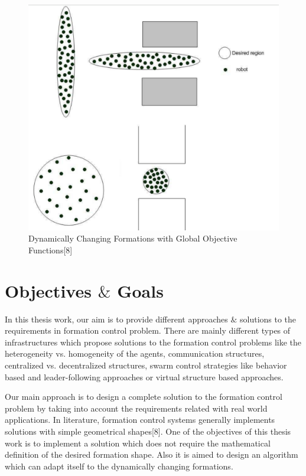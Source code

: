\begin{figure}[H]
\caption{Dynamically Changing Formations with Global Objective Functions[8]}
\centering
\includegraphics[scale = 0.32]{houslotine}
\end{figure}


\section{Objectives $\&$ Goals} \label{Objectives}
In this thesis work, our aim is to provide different approaches $\&$ solutions to the requirements in formation control problem.  There are mainly different types of  infrastructures which propose solutions to the formation control problems like the heterogeneity vs. homogeneity of the agents, communication structures, centralized vs. decentralized structures, swarm control strategies like behavior based and leader-following approaches or virtual structure based approaches. 

Our main approach is to design a complete solution to the formation control problem by taking into account the requirements related with real world applications. In literature, formation control systems generally implements solutions with simple geometrical shapes[8]. One of the objectives of this thesis work is to implement a solution which does not require the mathematical definition of the desired formation shape. Also it is aimed to design an algorithm which can adapt itself to the dynamically changing formations.

